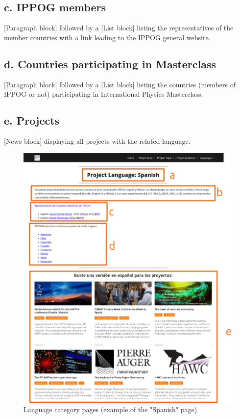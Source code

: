 \subsection*{c. IPPOG members}
[Paragraph block] followed by a [List block] listing the representatives of the member countries with a link leading to the IPPOG general website.

\subsection*{d. Countries participating in Masterclass}
[Paragraph block] followed by a [List block] listing the countries (members of IPPOG or not) participating in International Physics Masterclass.

\subsection*{e. Projects}
[News block] displaying all projects with the related language.

\begin{figure}[p]
    \centering
    \includegraphics[width=\linewidth]{Image/Architecture/structure_language.png}
    \caption{Language category pages (example of the "Spanish" page)}
    \label{fig:structure_language}
\end{figure}
\newpage

